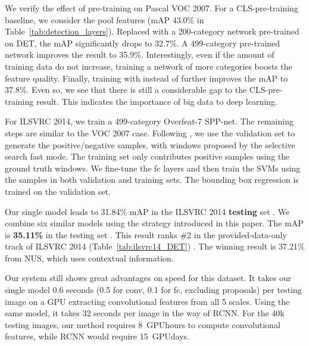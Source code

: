 \documentclass[10pt,journal,cspaper,compsoc]{IEEEtran}
\begin{document}
We verify the effect of pre-training on Pascal VOC 2007. For a CLS-pre-training baseline, we consider the pool features (mAP 43.0\% in Table~\ref{tab:detection_layers}). Replaced with a 200-category network pre-trained on DET, the mAP significantly drops to 32.7\%. A 499-category pre-trained network improves the result to 35.9\%. Interestingly, even if the amount of training data do not increase, training a network of more categories boosts the feature quality. Finally, training with  instead of  further improves the mAP to 37.8\%. Even so, we see that there is still a considerable gap to the CLS-pre-training result. This indicates the importance of big data to deep learning.

For ILSVRC 2014, we train a 499-category Overfeat-7 SPP-net. The remaining steps are similar to the VOC 2007 case. Following \cite{Girshick2014}, we use the validation set to generate the positive/negative samples, with windows proposed by the selective search fast mode. The training set only contributes positive samples using the ground truth windows. We fine-tune the fc layers and then train the SVMs using the samples in both validation and training sets. The bounding box regression is trained on the validation set.

Our single model leads to 31.84\% mAP in the ILSVRC 2014 \textbf{testing} set \cite{Russakovsky2014}. We combine six similar models using the strategy introduced in this paper. The mAP is \textbf{35.11\%} in the testing set \cite{Russakovsky2014}. This result ranks \#2 in the provided-data-only track of ILSVRC 2014 (Table~\ref{tab:ilsvrc14_DET}) \cite{Russakovsky2014}. The winning result is 37.21\% from NUS, which uses contextual information.

Our system still shows great advantages on speed for this dataset. It takes our single model 0.6 seconds (0.5 for conv, 0.1 for fc, excluding proposals) per testing image on a GPU extracting convolutional features from all 5 scales. Using the same model, it takes 32 seconds per image in the way of RCNN. For the 40k testing images, our method requires 8~GPUhours to compute convolutional features, while RCNN would require 15~GPUdays.
\end{document}
